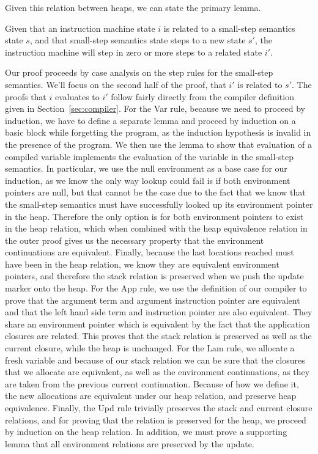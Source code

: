 Given this relation between heaps, we can state the primary lemma.
\begin{lemma} \label{lem:cesm_im}
Given that an instruction machine state $i$ is related to a small-step
semantics state $s$, and that small-step semantics state steps to a new state
$s'$, the instruction machine will step in zero or more steps to a related state
$i'$.
\end{lemma}
\begin{proofoutline}
Our proof proceeds by case analysis on the step rules for the small-step
semantics. We'll focus on the second half of the proof, that $i'$ is related to
$s'$. The proofs that $i$ evaluates to $i'$ follow fairly directly from the
compiler definition given in Section~\ref{sec:compiler}. For the Var rule,
because we need to proceed by induction, we have to define a separate lemma and
proceed by induction on a basic block while forgetting the program, as the
induction hypothesis is invalid in the presence of the program. We then use the
lemma to show that evaluation of a compiled variable implements the evaluation
of the variable in the small-step semantics. In particular, we use the null
environment as a base case for our induction, as we know the only way lookup
could fail is if both environment pointers are null, but that cannot be the
case due to the fact that we know that the small-step semantics must have
successfully looked up its environment pointer in the heap. Therefore the only
option is for both environment pointers to exist in the heap relation, which
when combined with the heap equivalence relation in the outer proof gives us the
necessary property that the environment continuations are equivalent. Finally,
because the last locations reached must have been in the heap relation, we know
they are equivalent environment pointers, and therefore the stack relation is
preserved when we push the update marker onto the heap. For the App rule, we use
the definition of our compiler to prove that the argument term and argument
instruction pointer are equivalent and that the left hand side term and
instruction pointer are also equivalent. They share an environment pointer which
is equivalent by the fact that the application closures are related.  This
proves that the stack relation is preserved as well as the current closure,
while the heap is unchanged. For the Lam rule, we allocate a fresh variable and
because of our stack relation we can be sure that the closures that we
allocate are equivalent, as well as the environment continuations, as they are
taken from the previous current continuation. Because of how we define it, the
new allocations are equivalent under our heap relation, and preserve heap
equivalence. Finally, the Upd rule trivially preserves the stack and current
closure relations, and for proving that the relation is preserved for the
heap, we proceed by induction on the heap relation. In addition, we must prove
a supporting lemma that all environment relations are preserved by the update.
\end{proofoutline}

